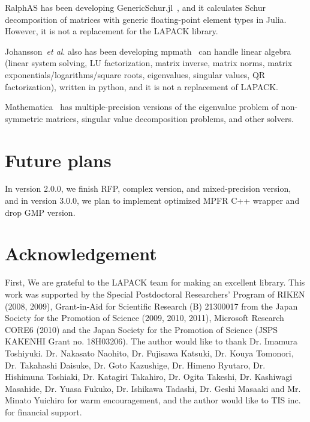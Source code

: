 \documentclass[12pt]{article}
\newcommand{\etal}{\textit{et al}.}
\begin{document}
RalphAS has been developing GenericSchur.jl~\cite{GenericSchur}, and it calculates Schur decomposition of matrices with generic floating-point element types in Julia. However, it is not a replacement for the LAPACK library.

Johansson~\etal{} also has been developing mpmath~\cite{mpmath} can handle linear algebra (linear system solving, LU factorization, matrix inverse, matrix norms, matrix exponentials/logarithms/square roots, eigenvalues, singular values, QR factorization), written in python, and it is not a replacement of LAPACK.

Mathematica~\cite{mathematica} has multiple-precision versions of the eigenvalue problem of non-symmetric matrices, singular value decomposition problems, and other solvers.

\section{Future plans}
\label{sec:futureplans}
In version 2.0.0, we finish RFP, complex version, and mixed-precision version, and in version 3.0.0, we plan to implement optimized MPFR C++ wrapper and drop GMP version.

\section*{Acknowledgement}

First, We are grateful to the LAPACK team for making an excellent library.
This work was supported by the Special Postdoctoral Researchers' Program of RIKEN (2008, 2009), Grant-in-Aid for Scientific Research (B) 21300017 from the Japan Society for the Promotion of Science (2009, 2010, 2011), Microsoft Research CORE6 (2010) and the Japan Society for the Promotion of Science (JSPS KAKENHI Grant no. 18H03206). 
The author would like to thank Dr. Imamura Toshiyuki. Dr. Nakasato Naohito, Dr. Fujisawa Katsuki, Dr. Kouya Tomonori, Dr. Takahashi Daisuke, Dr. Goto Kazushige, Dr. Himeno Ryutaro, Dr. Hishimuna Toshiaki, Dr. Katagiri Takahiro, Dr. Ogita Takeshi, Dr. Kashiwagi Masahide, Dr. Yuasa Fukuko, Dr. Ishikawa Tadashi, Dr. Geshi Masaaki and Mr. Minato Yuichiro for warm encouragement, and the author would like to TIS inc. for financial support.


\end{document}
